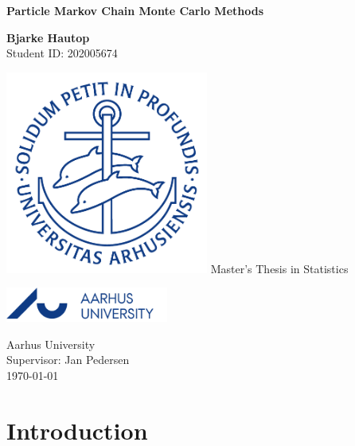 \documentclass[12pt,a4paper,oneside]{memoir}
\theoremstyle{definition}
\begin{document}
	
	\begin{center}
		\vspace*{1cm}
		
		\Huge 
		\textbf{Particle Markov Chain Monte Carlo  Methods}
		
		\vspace{1.5cm}
		
		\textbf{Bjarke Hautop}\\[0.5cm]
		\Large
		Student ID: 202005674
		
		\vspace{1.6cm}
		\includegraphics[width=0.5\textwidth]{segl.png}
		\vfill
		\Huge
		Master's Thesis in Statistics
		
		\vspace{0.8cm}
		
		\includegraphics[width=0.4\textwidth]{logo.png}
		
		\Large
		Aarhus University\\
		Supervisor: Jan Pedersen\\
		\today
		
	\end{center}
	\newpage
	
	\newpage
	
	
	\tableofcontents*
	
	\chapter{Introduction}
	
	
\end{document}
